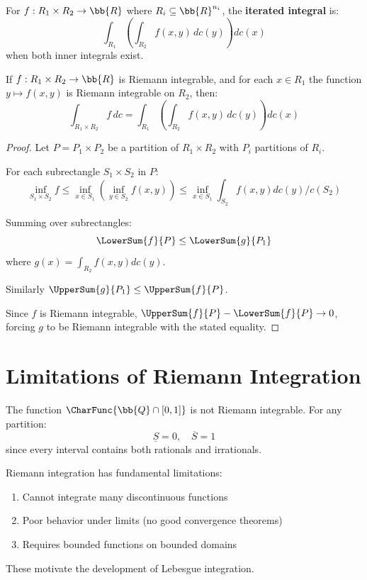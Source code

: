 \begin{definition}
For $f: R_1 \times R_2 \to \bb{R}$ where $R_i \subseteq \bb{R}^{n_i}$, the \textbf{iterated integral} is:
\[ \int_{R_1} \left( \int_{R_2} f(x, y) \, dc(y) \right) dc(x) \]
when both inner integrals exist.
\end{definition}

\begin{theorem}
If $f: R_1 \times R_2 \to \bb{R}$ is Riemann integrable, and for each $x \in R_1$ the function $y \mapsto f(x, y)$ is Riemann integrable on $R_2$, then:
\[ \int_{R_1 \times R_2} f \, dc = \int_{R_1} \left( \int_{R_2} f(x, y) \, dc(y) \right) dc(x) \]
\end{theorem}

\begin{proof}
Let $P = P_1 \times P_2$ be a partition of $R_1 \times R_2$ with $P_i$ partitions of $R_i$.

For each subrectangle $S_1 \times S_2$ in $P$:
\[ \inf_{S_1 \times S_2} f \leq \inf_{x \in S_1} \left( \inf_{y \in S_2} f(x, y) \right) \leq \inf_{x \in S_1} \int_{S_2} f(x, y) dc(y) / c(S_2) \]

Summing over subrectangles:
\[ \LowerSum{f}{P} \leq \LowerSum{g}{P_1} \]
where $g(x) = \int_{R_2} f(x, y) dc(y)$.

Similarly $\UpperSum{g}{P_1} \leq \UpperSum{f}{P}$.

Since $f$ is Riemann integrable, $\UpperSum{f}{P} - \LowerSum{f}{P} \to 0$, forcing $g$ to be Riemann integrable with the stated equality.
\end{proof}

\section{Limitations of Riemann Integration}

\begin{example}
The function $\CharFunc{\bb{Q} \cap [0,1]}$ is not Riemann integrable. For any partition:
\[ \underline{S} = 0, \quad \overline{S} = 1 \]
since every interval contains both rationals and irrationals.
\end{example}

\begin{remark}
Riemann integration has fundamental limitations:
\begin{enumerate}
    \item Cannot integrate many discontinuous functions
    \item Poor behavior under limits (no good convergence theorems)
    \item Requires bounded functions on bounded domains
\end{enumerate}
These motivate the development of Lebesgue integration.
\end{remark}


